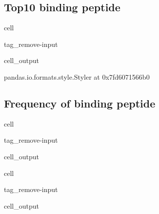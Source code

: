 \documentclass[letterpaper,10pt,english]{jupyterBook}
\begin{document}
\subsection{Top10 binding peptide}
\label{\detokenize{ipynb/chapter2:top10-binding-peptide}}
\begin{sphinxuseclass}{cell}
\begin{sphinxuseclass}{tag_remove-input}\begin{sphinxVerbatimOutput}

\begin{sphinxuseclass}{cell_output}
\begin{sphinxVerbatim}[commandchars=\\\{\}]
\PYGZlt{}pandas.io.formats.style.Styler at 0x7fd6071566b0\PYGZgt{}
\end{sphinxVerbatim}

\end{sphinxuseclass}\end{sphinxVerbatimOutput}

\end{sphinxuseclass}
\end{sphinxuseclass}

\subsection{Frequency of binding peptide}
\label{\detokenize{ipynb/chapter2:id2}}
\begin{sphinxuseclass}{cell}
\begin{sphinxuseclass}{tag_remove-input}\begin{sphinxVerbatimOutput}

\begin{sphinxuseclass}{cell_output}
\noindent{}

\end{sphinxuseclass}\end{sphinxVerbatimOutput}

\end{sphinxuseclass}
\end{sphinxuseclass}
\begin{sphinxuseclass}{cell}
\begin{sphinxuseclass}{tag_remove-input}\begin{sphinxVerbatimOutput}

\begin{sphinxuseclass}{cell_output}
\noindent{}

\end{sphinxuseclass}\end{sphinxVerbatimOutput}

\end{sphinxuseclass}
\end{sphinxuseclass}
\end{document}
